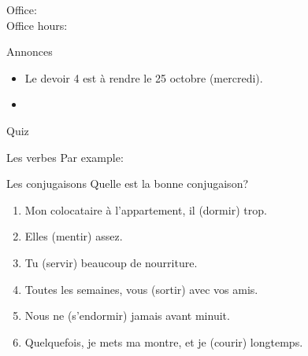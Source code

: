 \documentclass{beamer}
\subtitle[Heures et verbes \lexi{-ir}]{Les heures et les verbes \lexi{-ir}}
\begin{document}
  \begin{frame}
    \titlepage
    \tiny{Office: \\
          Office hours: }
  \end{frame}

  \begin{frame}{Annonces}
    \begin{itemize}
      \item Le devoir 4 est à rendre le 25 octobre (mercredi).
      \item[] 
    \end{itemize}
  \end{frame}

  \begin{frame}{}
    \begin{center}
      \Large Quiz
    \end{center}
  \end{frame}

  \begin{frame}{Les verbes }
    Par example:
    \begin{center}
      
    \end{center}
  \end{frame}

  \begin{frame}{Les conjugaisons}
    Quelle est la bonne conjugaison? \\
    \begin{enumerate}
      \item Mon colocataire à l'appartement, il \underline{} (dormir) trop.
      \item Elles \underline{} (mentir) assez.
      \item Tu \underline{} (servir) beaucoup de nourriture.
      \item Toutes les semaines, vous \underline{} (sortir) avec vos amis.
      \item Nous ne \underline{} (s'endormir) jamais avant minuit.
      \item Quelquefois, je mets ma montre, et je \underline{} (courir) longtemps.
    \end{enumerate}
  \end{frame}
\end{document}
